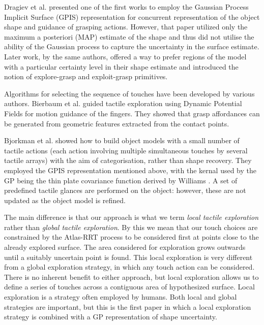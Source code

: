 Dragiev et al. \cite{Dragiev2011Gaussian} presented one of the first works to employ the Gaussian Process Implicit Surface (GPIS) representation for concurrent representation of the object shape and guidance of grasping actions. However, that paper utilized only the maximum a posteriori (MAP) estimate of the shape and thus did not utilise the ability of the Gaussian process to capture the uncertainty in the surface estimate. Later work, by the same authors, \cite{Dragiev2013Uncertainty} offered a way to prefer regions of the model with a particular certainty level in their shape estimate and introduced the notion of explore-grasp and exploit-grasp primitives.

Algorithms for selecting the sequence of touches have been developed by various authors. Bierbaum et al. \cite{Bierbaum2008Potential} guided tactile exploration using Dynamic Potential Fields for motion guidance of the fingers. They showed that grasp affordances can be generated from geometric features extracted from the contact points.

Bjorkman et al. \cite{Bjorkman2013Enhancing} showed how to build object models with a small number of tactile actions (each action involving multiple simultaneous touches by several tactile arrays) with the aim of categorisation, rather than shape recovery. They employed the GPIS representation mentioned above, with the kernal used by the GP being the thin plate covariance function derived by Williams \cite{Williams2007Gaussian}. A set of predefined tactile glances are performed on the object: however, these are not updated as the object model is refined. 

The main difference is that our approach is what we term {\em local tactile exploration} rather than {\em global tactile exploration}. By this we mean that our touch choices are constrained by the Atlas-RRT process to be considered first at points close to the already explored surface. The area considered for exploration grows outwards until a suitably uncertain point is found. This local exploration is very different from a global exploration strategy, in which any touch action can be considered. There is no inherent benefit to either approach, but local exploration allows us to define a series of touches across a contiguous area of hypothesized surface. Local exploration is a strategy often employed by humans. Both local and global strategies are important, but this is the first paper in which a local exploration strategy is combined with a GP representation of shape uncertainty. 

